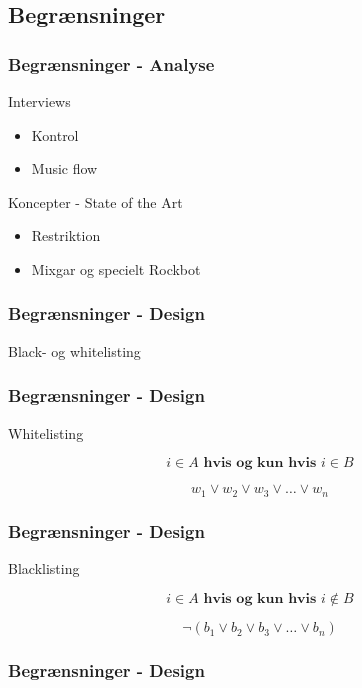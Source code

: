 \subsection{Begrænsninger}
\begin{frame}
	\frametitle{Begrænsninger - Analyse}
	Interviews
	\begin{itemize}
		\item Kontrol
		\item Music flow
	\end{itemize}
	Koncepter - State of the Art
	\begin{itemize}
		\item Restriktion
		\item Mixgar og specielt Rockbot
	\end{itemize}
\end{frame}

\begin{frame}
	\frametitle{Begrænsninger - Design}
	Black- og whitelisting
\end{frame}

\begin{frame}
	\frametitle{Begrænsninger - Design}
	Whitelisting
	
	\begin{equation}
		i \in A \textbf{ hvis og kun hvis } i \in B
	\end{equation}
	
	\begin{equation}
		w_1 \vee w_2 \vee w_3 \vee \dots \vee w_n
	\end{equation}
\end{frame}

\begin{frame}
	\frametitle{Begrænsninger - Design}
	Blacklisting
	
	\begin{equation}
		i \in A \textbf{ hvis og kun hvis } i \notin B
	\end{equation}
	
	\begin{equation}
		\neg(b_1 \vee b_2 \vee b_3 \vee \dots \vee b_n)
	\end{equation}
\end{frame}

\begin{frame}
\frametitle{Begrænsninger - Design}
\begin{algorithmic}[1]

		\EndFor{}
	\EndFunction{}\\
	
\end{algorithmic}
\end{frame}
		
